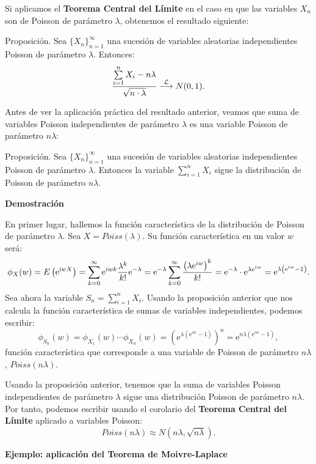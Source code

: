 \documentclass[]{book}
\begin{document}
Si aplicamos el \textbf{Teorema Central del Límite} en el caso en que las variables \(X_n\) son de Poisson de parámetro \(\lambda\), obtenemos el resultado siguiente:

 Proposición.
Sea \(\{X_n\}_{n=1}^\infty\) una sucesión de variables aleatorias independientes Poisson de parámetro \(\lambda\). Entonces:
\[
\frac{\sum\limits_{i=1}^n X_i -n\lambda}{\sqrt{n\cdot \lambda}}\stackrel{{\cal L}}{\longrightarrow} N(0,1).
\]

Antes de ver la aplicación práctica del resultado anterior, veamos que suma de variables Poisson independientes de parámetro \(\lambda\) es una variable Poisson de parámetro \(n\lambda\):

 Proposición.
Sea \(\{X_n\}_{n=1}^\infty\) una sucesión de variables aleatorias independientes Poisson de parámetro \(\lambda\). Entonces la variable \(\sum\limits_{i=1}^n X_i\) sigue la distribución de Poisson de parámetro \(n\lambda\).

\textbf{Demostración}

En primer lugar, hallemos la función característica de la distribución de Poisson de parámetro \(\lambda\). Sea \(X=Poiss(\lambda)\). Su función característica en un valor \(w\) será:
\[
\scriptsize{
\phi_X(w)=E\left(\mathrm{e}^{\mathrm{i} w X}\right)=\sum_{k=0}^\infty \mathrm{e}^{i w k}\frac{\lambda^k}{k!}\mathrm{e}^{-\lambda}=\mathrm{e}^{-\lambda} \sum_{k=0}^\infty \frac{\left(\lambda\mathrm{e}^{iw}\right)^k}{k!}=\mathrm{e}^{-\lambda}\cdot \mathrm{e}^{\lambda\mathrm{e}^{iw}}=\mathrm{e}^{\lambda \left(\mathrm{e}^{iw}-1\right)}.
}
\]
Sea ahora la variable \(S_n=\sum\limits_{i=1}^n X_i\). Usando la proposición anterior que nos calcula la función característica de sumas de variables independientes, podemos escribir:
\[
\phi_{S_n}(w)=\phi_{X_1}(w)\cdots \phi_{X_n}(w)=\left(\mathrm{e}^{\lambda \left(\mathrm{e}^{iw}-1\right)}\right)^n =\mathrm{e}^{n\lambda \left(\mathrm{e}^{iw}-1\right)},
\]
función característica que corresponde a una variable de Poisson de parámetro \(n\lambda\), \(Poiss(n\lambda)\).

Usando la proposición anterior, tenemos que la suma de variables Poisson independientes de parámetro \(\lambda\) sigue una distribución Poisson de parámetro \(n\lambda\). Por tanto, podemos escribir usando el corolario del \textbf{Teorema Central del Límite} aplicado a variables Poisson:
\[
Poiss(n\lambda)\approx N(n\lambda,\sqrt{n\lambda}).
\]

\textbf{Ejemplo: aplicación del Teorema de Moivre-Laplace}
\end{document}

